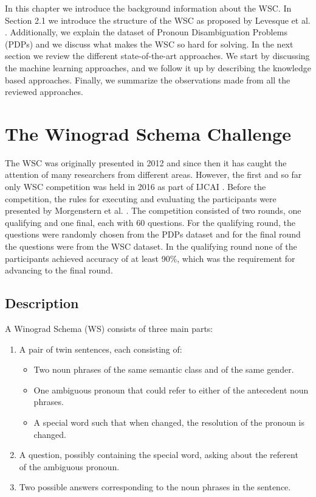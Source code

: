 \label{Background}
In this chapter we introduce the background information about the WSC. In Section 2.1 we introduce the structure of the WSC as proposed by Levesque et al. \cite{DBLP:conf/kr/LevesqueDM12}. 
Additionally, we explain the dataset of Pronoun Disambiguation Problems (PDPs) and we discuss what makes the WSC so hard for solving. In the next section we review the different state-of-the-art approaches. We start by discussing the machine learning approaches, and we follow it up by describing the knowledge based approaches. Finally, we summarize the observations made from all the reviewed approaches.

 
\section{The Winograd Schema Challenge}
\label{section:TheWinogradSchemaChallenge}

The WSC was originally presented in 2012 \cite{DBLP:conf/kr/LevesqueDM12} and since then it has caught the  attention of many researchers from different areas. However, the first and so far only WSC competition was held in 2016 as part of IJCAI \cite{ijcai}. Before the competition, the rules for executing and evaluating the participants were presented by Morgenstern et al. \cite{DBLP:journals/aim/MorgensternDO16}. The competition consisted of two rounds, one qualifying and one final, each with 60 questions. For the qualifying round, the questions were randomly chosen from the PDPs dataset and for the final round the questions were from the WSC dataset. In the qualifying round none of the participants achieved accuracy of at least 90\%, which was the requirement for advancing to the final round. 

\subsection{Description}
A Winograd Schema (WS) consists of three main parts:

\begin{enumerate}
	\item A pair of twin sentences, each consisting of:
	\begin{itemize}
		\item Two noun phrases of the same semantic class and of the same gender.
		\item One ambiguous pronoun that could refer to either of the antecedent noun phrases.
		\item A special word such that when changed, the resolution of the pronoun is changed.
	\end{itemize}
    \item A question, possibly containing the special word, asking about the referent \\of the ambiguous pronoun.
    \item Two possible answers corresponding to the noun phrases in the sentence.
\end{enumerate}

